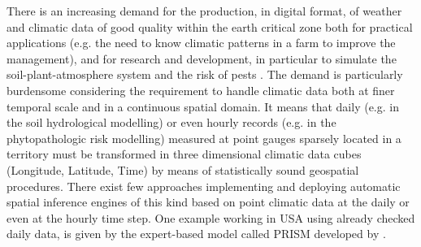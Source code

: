 \documentclass[authoryear,preprint,review,12pt]{elsarticle}
\newcommand{\note}[1]{\emph{\textcolor{red}{#1}}}
\begin{document}
There is an increasing demand for the production, in digital format, of weather and climatic data of good quality within the earth critical zone both 
    for practical applications (e.g. the need to know climatic patterns in a farm to improve the management),
    and
    for research and development, in particular to simulate the soil-plant-atmosphere system \citep{Hoogenboom:agrometeo-swat:2000,Jones:swat:2003,Langella:rainann:2010,Seneviratne:swat:2010} and the risk of pests \citep{Orlandini:plasmopara:2008,Rossi:vitenet:2014,Terribile:dssvitis:2017}.
The demand is particularly burdensome considering the requirement to handle climatic data both at finer temporal scale and in a continuous spatial domain.
It means that daily (e.g. in the soil hydrological modelling) or even hourly records (e.g. in the phytopathologic risk modelling) measured at point gauges sparsely located in a territory must be transformed in three dimensional climatic data cubes (Longitude, Latitude, Time) by means of statistically sound geospatial procedures.
There exist few approaches implementing and deploying automatic spatial inference engines of this kind based on point climatic data at the daily or even at the hourly time step.
One example working in USA using already checked daily data, is given by the expert-based model called PRISM developed by  \cite{Daly08_PRISM_USA}. %
\end{document}
